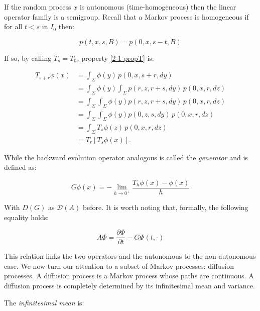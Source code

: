 If the random process $x$ is autonomous (time-homogeneous) then the linear operator family is a 
semigroup. Recall that a Markov process is homogeneous if for all $t<s$ in $I_0$ then:

\[p(t,x,s,B) = p(0,x,s-t,B)\]

If so, by calling $T_s=T_{0s}$ property \ref{2-1-propT} is:

\begin{align}
    T_{s+r}\phi(x) & = \int_{\Sigma} \phi(y)\,p(0,x,s+r,dy) \\
    & = \int_{\Sigma}\phi(y)\int_{\Sigma} p(r,z,r+s,dy)\,p(0,x,r,dz) \\
    & = \int_{\Sigma}\int_{\Sigma} \phi(y) p(r,z,r+s,dy)\,p(0,x,r,dz) \\
    & = \int_{\Sigma}\int_{\Sigma} \phi(y) p(0,z,s,dy)\,p(0,x,r,dz) \\
    & = \int_{\Sigma} T_{s}\phi(z) \,p(0,x,r,dz) \\
    & = T_r\left[T_s\phi(x)\right].
\end{align}

While the backward evolution operator analogous is called the \textit{generator} and is defined as:

\begin{equation}
    G\phi(x) = - \lim_{h\to0^+} \frac{T_h\phi(x) - \phi(x)}{h}
\end{equation}

With $D(G)$ as $\mathcal{D}(A)$ before. It is worth noting that, formally, the following equality holds:

\begin{equation}
    A\Phi = \frac{\partial \Phi}{\partial t} - G\Phi(t,\cdot)
\end{equation}

This relation links the two operators and the autonomous to the non-autonomous case. We now turn our attention to 
a subset of Markov processes: diffusion processes. A diffusion process is a Markov process whose paths are continuous. 
A diffusion process is completely determined by its infinitesimal mean and variance. 

\begin{definition}
    The \textit{infinitesimal mean} is:

    \begin{equation}
        
    \end{equation}
\end{definition}